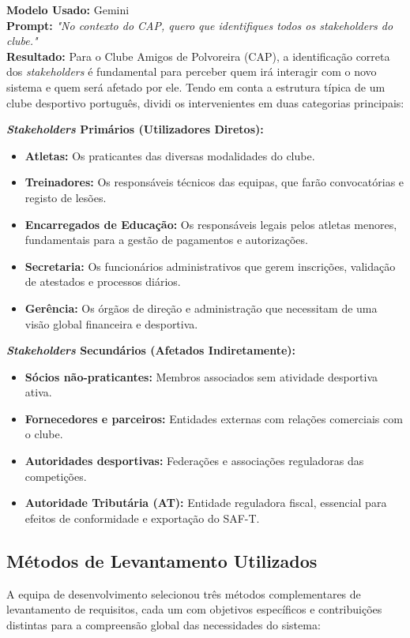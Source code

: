 \documentclass[a4paper,12pt]{scrreprt}
\newcommand{\caixaprompt}[3]{
    \begin{tcolorbox}[
        enhanced,
        colback=azulclaro,      %
        colframe=blue!50!black, %
        arc=2mm,                %
        boxrule=0.5mm,          %
        title=\textbf{Documentação de IA}, %
        fonttitle=\sffamily,
        coltitle=black,
        attach title to upper,
        after title={\par\medskip},
    ]
        \textbf{Modelo Usado:} #1 \\
        \textbf{Prompt:} \textit{"#2"} \\
        \tcbline %
        \textbf{Resultado:} #3
    \end{tcolorbox}
}
\begin{document}
\caixaprompt{Gemini}{No contexto do CAP, quero que identifiques todos os stakeholders do clube.}{Para o Clube Amigos de Polvoreira (CAP), a identificação correta dos \textit{stakeholders} é fundamental para perceber quem irá interagir com o novo sistema e quem será afetado por ele. Tendo em conta a estrutura típica de um clube desportivo português, dividi os intervenientes em duas categorias principais:

\textbf{\textit{Stakeholders} Primários (Utilizadores Diretos):}
\begin{itemize}
    \item \textbf{Atletas:} Os praticantes das diversas modalidades do clube.
    \item \textbf{Treinadores:} Os responsáveis técnicos das equipas, que farão convocatórias e registo de lesões.
    \item \textbf{Encarregados de Educação:} Os responsáveis legais pelos atletas menores, fundamentais para a gestão de pagamentos e autorizações.
    \item \textbf{Secretaria:} Os funcionários administrativos que gerem inscrições, validação de atestados e processos diários.
    \item \textbf{Gerência:} Os órgãos de direção e administração que necessitam de uma visão global financeira e desportiva.
\end{itemize}

\textbf{\textit{Stakeholders} Secundários (Afetados Indiretamente):}
\begin{itemize}
    \item \textbf{Sócios não-praticantes:} Membros associados sem atividade desportiva ativa.
    \item \textbf{Fornecedores e parceiros:} Entidades externas com relações comerciais com o clube.
    \item \textbf{Autoridades desportivas:} Federações e associações reguladoras das competições.
    \item \textbf{Autoridade Tributária (AT):} Entidade reguladora fiscal, essencial para efeitos de conformidade e exportação do SAF-T.
\end{itemize}}



\subsection{Métodos de Levantamento Utilizados}

A equipa de desenvolvimento selecionou três métodos complementares de levantamento de requisitos, cada um com objetivos específicos e contribuições distintas para a compreensão global das necessidades do sistema:
\end{document}
